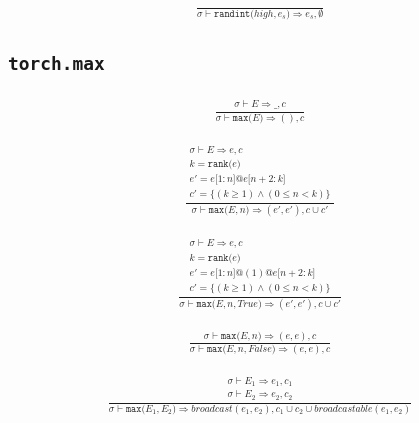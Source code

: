 \documentclass{article}
\makeatletter
\newcommand{\Rar}{\Rightarrow}
\newcommand{\mtt}[1]{\mathtt{#1}}
\newcommand{\op}[2]{\mtt{#1(}#2\mtt{)}}
\newcommand{\conc}{\mtt{@}}
\newcommand{\indr}[2]{\mtt{[}#1\mtt{:}#2\mtt{]}}
\makeatother
\begin{document}
\begin{align*}
  \frac
  {
  }
  {
    \sigma \vdash \op{randint}{high, e_s} \Rar e_s, \emptyset
  }
\end{align*}%

\subsection*{\texttt{torch.max}}%
\begin{align*}
  \frac
  {
    \begin{array}{l}
      \sigma \vdash E \Rar \_, c
    \end{array}
  }
  {
    \sigma \vdash \op{max}{E} \Rar (), c
  }
\end{align*}

\begin{align*}
  \frac
  {
    \begin{array}{l}
      \sigma \vdash E \Rar e, c \\
      k = \op{rank}{e} \\
      e' = e \indr{1}{n} \conc e \indr{n+2}{k} \\
      c' = \{ (k \geq 1) \land (0 \leq n < k) \}
    \end{array}
  }
  {
    \sigma \vdash \op{max}{E, n} \Rar (e', e'), c \cup c'
  }
  \tag*{tuple 형태로 반환}
\end{align*}

\begin{align*}
  \frac
  {
    \begin{array}{l}
      \sigma \vdash E \Rar e, c \\
      k = \op{rank}{e} \\
      e' = e \indr{1}{n} \conc (1) \conc e \indr{n+2}{k} \\
      c' = \{ (k \geq 1) \land (0 \leq n < k) \}
    \end{array}
  }
  {
    \sigma \vdash \op{max}{E, n, True} \Rar (e', e'), c \cup c'
  }
  \tag*{tuple 형태로 반환}
\end{align*}

\begin{align*}
  \frac
  {
    \sigma \vdash \op{max}{E, n} \Rar (e, e), c
  }
  {
    \sigma \vdash \op{max}{E, n, False} \Rar (e, e), c
  }
  \tag*{tuple 형태로 반환}
\end{align*}

\begin{align*}
  \frac
  {
    \begin{array}{l}
      \sigma \vdash E_1 \Rar e_1, c_1 \\
      \sigma \vdash E_2 \Rar e_2, c_2
    \end{array}
  }
  {
    \sigma \vdash \op{max}{E_1, E_2} \Rar broadcast(e_1, e_2),
      c_1 \cup c_2 \cup broadcastable(e_1, e_2)
  }
\end{align*}%
\end{document}
